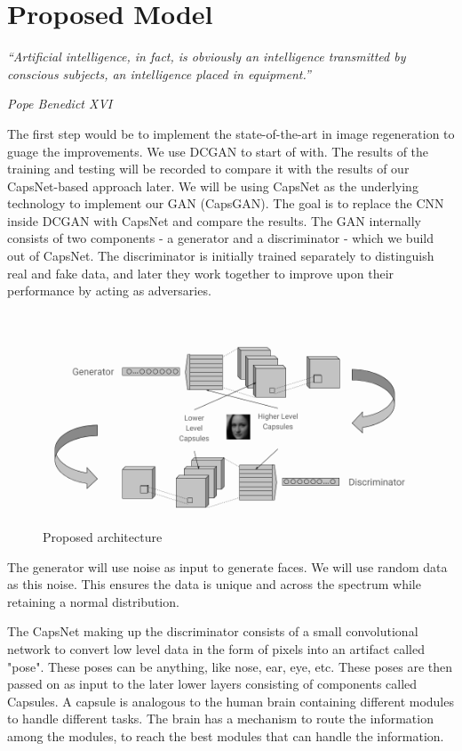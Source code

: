 \chapter{Proposed Model}\label{ch:proposed_model}
\epigraph{\textit{\normalsize “Artificial intelligence, in fact, is obviously an intelligence transmitted by conscious subjects, an intelligence placed in equipment.”}}{\textit{ \normalsize Pope Benedict XVI}}

The first step would be to implement the state-of-the-art in image regeneration to guage the improvements. We use DCGAN to start of with. The results of the training and testing will be recorded to compare it with the results of our CapsNet-based approach later. We will be using CapsNet as the underlying technology to implement our GAN (CapsGAN). The goal is to replace the CNN inside DCGAN with CapsNet and compare the results. The GAN internally consists of two components - a generator and a discriminator - which we build out of CapsNet. The discriminator is initially trained separately to distinguish real and fake data, and later they work together to improve upon their performance by acting as adversaries.
\par\bigskip

\begin{figure}[H]
\centering\includegraphics[width=1\textwidth]{images/methodology.png}
\caption{Proposed architecture}
\label{fig:capsgan}
\end{figure}

The generator will use noise as input to generate faces. We will use random data as this noise. This ensures the data is unique and across the spectrum while retaining a normal distribution.
\par\bigskip

The CapsNet making up the discriminator consists of a small convolutional network to convert low level data in the form of pixels into an artifact called "pose". These poses can be anything, like nose, ear, eye, etc. These poses are then passed on as input to the later lower layers consisting of components called Capsules. A capsule is analogous to the human brain containing different modules to handle different tasks. The brain has a mechanism to route the information among the modules, to reach the best modules that can handle the information.
\par\bigskip

